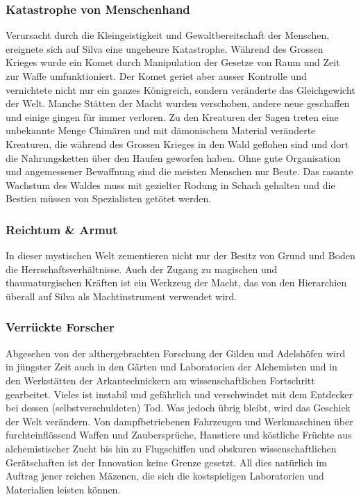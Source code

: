 \documentclass[12pt,twoside,twocolumn,openany]{book}
\begin{document}
\subsubsection{Katastrophe von Menschenhand} Verursacht durch die Kleingeistigkeit und Gewaltbereitschaft der Menschen, ereignete sich auf Silva eine ungeheure Katastrophe. Während des Grossen Krieges wurde ein Komet durch Manipulation der Gesetze von Raum und Zeit zur Waffe umfunktioniert. Der Komet geriet aber ausser Kontrolle und vernichtete nicht nur ein ganzes Königreich, sondern veränderte das Gleichgewicht der Welt. Manche Stätten der Macht wurden verschoben, andere neue geschaffen und einige gingen für immer verloren. Zu den Kreaturen der Sagen treten eine unbekannte Menge Chimären und mit dämonischem Material veränderte Kreaturen, die während des Grossen Krieges in den Wald geflohen sind und dort die Nahrungsketten über den Haufen geworfen haben. Ohne gute Organisation und angemessener Bewaffnung sind die meisten Menschen nur Beute. Das rasante Wachstum des Waldes muss mit gezielter Rodung in Schach gehalten und die Bestien müssen von Spezialisten getötet werden.

\subsubsection{Reichtum \& Armut}
In dieser mystischen Welt zementieren nicht nur der Besitz von Grund und Boden die Herrschaftsverhältnisse. Auch der Zugang zu magischen und thaumaturgischen Kräften ist ein Werkzeug der Macht, das von den Hierarchien überall auf Silva als Machtinstrument verwendet wird.


\subsubsection{Verrückte Forscher}
Abgesehen von der althergebrachten Forschung der Gilden und Adelshöfen wird in jüngster Zeit auch in den Gärten und Laboratorien der Alchemisten und in den Werkstätten der Arkantechnickern am wissenschaftlichen Fortschritt gearbeitet. Vieles ist instabil und gefährlich und verschwindet mit dem Entdecker bei dessen (selbstverschuldeten) Tod. Was jedoch übrig bleibt, wird das Geschick der Welt verändern. Von dampfbetriebenen Fahrzeugen und Werkmaschinen über furchteinflössend Waffen und Zaubersprüche, Haustiere und köstliche Früchte aus alchemistischer Zucht bis hin zu Flugschiffen und obskuren wissenschaftlichen Gerätschaften ist der Innovation keine Grenze gesetzt. All dies natürlich im Auftrag jener reichen Mäzenen, die sich die kostspieligen Laboratorien und Materialien leisten können.
\end{document}
